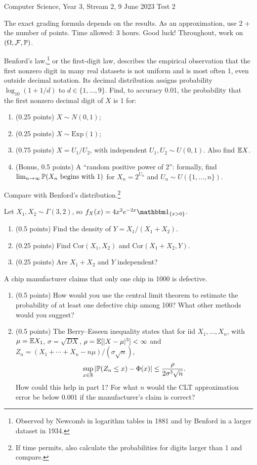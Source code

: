 \documentclass[a4paper]{report}
\begin{document}
\noindent Computer Science, Year 3, Stream 2, 9 June 2023 \hfill Test 2
\hrulefill
\begin{it}The exact grading formula depends on the results. As an approximation, use 2 + the number of points. Time allowed: 3 hours. Good luck! Throughout, work on $(\Omega,\mathcal F,\P)$.\end{it}
\begin{problem}
Benford's law,\footnote{Observed by Newcomb in logarithm tables in 1881 and by Benford in a larger dataset in 1934.} or the first-digit law, describes the empirical observation that the first nonzero digit in many real datasets is not uniform and is most often 1, even outside decimal notation. Its decimal distribution assigns probability $\log_{10}(1+1/d)$ to $d\in\{1,\ldots,9\}$.
Find, to accuracy 0.01, the probability that the first nonzero decimal digit of $X$ is 1 for:
\begin{enumerate}
\item (0.25 points) $X\sim N(0,1)$;
\item (0.25 points) $X\sim\mathrm{Exp}(1)$;
\item (0.75 points) $X=U_1/U_2$, with independent $U_1,U_2\sim U(0,1)$. Also find $\E X$.
\item (Bonus, 0.5 points) A ``random positive power of 2'': formally, find $\lim_{n\to\infty}\P(X_n\text{ begins with 1})$ for $X_n=2^{U_n}$ and $U_n\sim U(\{1,\ldots,n\})$.
\end{enumerate}
Compare with Benford's distribution.\footnote{If time permits, also calculate the probabilities for digits larger than 1 and compare.}
\end{problem}
\begin{problem}
Let $X_1,X_2\sim\Gamma(3,2)$, so $f_X(x)=4x^2e^{-2x}\mathbbm1_{\{x>0\}}$.
\begin{enumerate}
\item (0.5 points) Find the density of $Y=X_1/(X_1+X_2)$.
\item (0.25 points) Find $\mathrm{Cor}(X_1,X_2)$ and $\mathrm{Cor}(X_1+X_2,Y)$.
\item (0.25 points) Are $X_1+X_2$ and $Y$ independent?
\end{enumerate}
\end{problem}
\begin{problem}
A chip manufacturer claims that only one chip in 1000 is defective.
\begin{enumerate}
\item (0.5 points) How would you use the central limit theorem to estimate the probability of at least one defective chip among 100? What other methods would you suggest?
\item (0.5 points) The Berry--Esseen inequality states that for iid $X_1,\ldots,X_n$, with $\mu=\E X_1$, $\sigma=\sqrt{DX}$, $\rho=\E[|X-\mu|^3]<\infty$ and $Z_n=(X_1+\cdots+X_n-n\mu)/(\sigma\sqrt n)$,
\[\sup_{x\in\mathbb R}|\P(Z_n\leq x)-\Phi(x)|\leq\frac{\rho}{2\sigma^3\sqrt n}.\]
How could this help in part 1? For what $n$ would the CLT approximation error be below 0.001 if the manufacturer's claim is correct?
\end{enumerate}
\end{problem}
\end{document}
